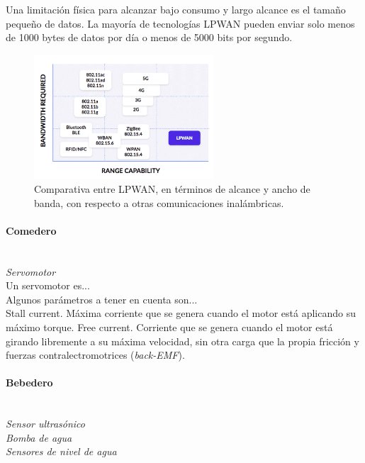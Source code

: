 \documentclass[12pt]{article}
\newcommand{\subsubsubsection}[1]{\paragraph{#1}\mbox{}\\}
\begin{document}
	\noindent Una limitación física para alcanzar bajo consumo y largo alcance es el tamaño pequeño de datos. La mayoría de tecnologías LPWAN pueden enviar solo menos de 1000 bytes de datos por día o menos de 5000 bits por segundo. \\
	
	\begin{figure}[h]
		\begin{center}
			\includegraphics[width=0.6\textwidth]{img/LPWAN_comp.png}
			\caption{Comparativa entre LPWAN, en términos de alcance y ancho de banda, con respecto a otras comunicaciones inalámbricas.}
			\label{LPWANs vs otros}
		\end{center}
	\end{figure}

	\pagebreak
	
	\subsubsubsection{Comedero}
	
	\noindent \textit{Servomotor} \\
	
	\noindent Un servomotor es... \\
	
	\noindent Algunos parámetros a tener en cuenta son... \\
	\noindent Stall current. Máxima corriente que se genera cuando el motor está aplicando su máximo torque. Free current. Corriente que se genera cuando el motor está girando libremente a su máxima velocidad, sin otra carga que la propia fricción y fuerzas contralectromotrices (\textit{back-EMF}). \\
	
	\pagebreak
	
	\subsubsubsection{Bebedero}
	
	\noindent \textit{Sensor ultrasónico}\\
	
	\noindent \textit{Bomba de agua} \\
	
	\noindent \textit{Sensores de nivel de agua} \\
	
\end{document}
